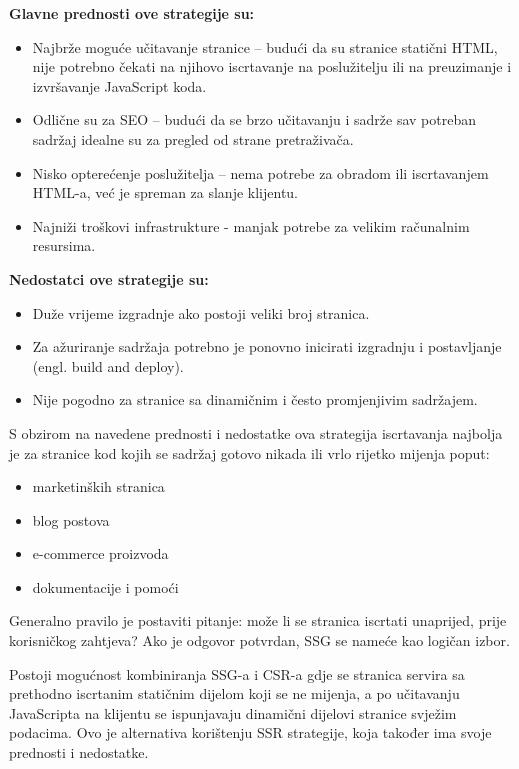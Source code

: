 \bigskip
\textbf{Glavne prednosti ove strategije su: }\cite{moore2024rendering}
\begin{itemize}
    \item Najbrže moguće učitavanje stranice – budući da su stranice statični HTML, nije potrebno čekati na njihovo iscrtavanje na poslužitelju ili na preuzimanje i izvršavanje JavaScript koda.
    \item Odlične su za SEO – budući da se brzo učitavanju i sadrže sav potreban sadržaj idealne su za pregled od strane pretraživača.
    \item Nisko opterećenje poslužitelja – nema potrebe za obradom ili iscrtavanjem HTML-a, već je spreman za slanje klijentu.
    \item Najniži troškovi infrastrukture - manjak potrebe za velikim računalnim resursima.
\end{itemize}

\bigskip

\textbf{Nedostatci ove strategije su:}

\begin{itemize}
    \item Duže vrijeme izgradnje ako postoji veliki broj stranica.
    \item Za ažuriranje sadržaja potrebno je ponovno inicirati izgradnju i postavljanje (engl. build and deploy).
    \item Nije pogodno za stranice sa dinamičnim i često promjenjivim sadržajem.
\end{itemize}

S obzirom na navedene prednosti i nedostatke ova strategija iscrtavanja najbolja je za stranice kod kojih se sadržaj gotovo nikada ili vrlo rijetko mijenja poput:
\begin{itemize}
    \item marketinških stranica
    \item blog postova
    \item e-commerce proizvoda
    \item dokumentacije i pomoći
\end{itemize}
Generalno pravilo je postaviti pitanje: može li se stranica iscrtati unaprijed, prije korisničkog zahtjeva? Ako je odgovor potvrdan, SSG se nameće kao logičan izbor. \cite{nextjsssg}

Postoji mogućnost kombiniranja SSG-a i CSR-a gdje se stranica servira sa prethodno iscrtanim statičnim dijelom koji se ne mijenja, a po učitavanju JavaScripta na klijentu se ispunjavaju dinamični dijelovi stranice svježim podacima. Ovo je alternativa korištenju SSR strategije, koja također ima svoje prednosti i nedostatke. \cite{nextjsssg}

